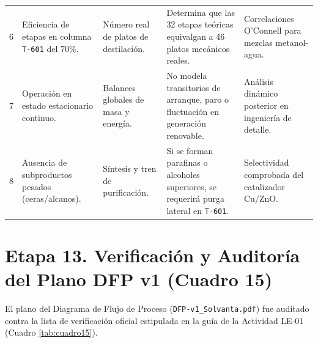 \documentclass[10pt,letterpaper]{article}
\begin{document}
\begin{table}[H]
\begin{tabularx}{\textwidth}{c >{\raggedright\arraybackslash}p{2.6cm} >{\raggedright\arraybackslash}p{2.2cm} >{\raggedright\arraybackslash}X >{\raggedright\arraybackslash}p{3.2cm}}
6 & Eficiencia de etapas en columna \texttt{T-601} del $70\%$. & Número real de platos de destilación. & Determina que las 32 etapas teóricas equivalgan a 46 platos mecánicos reales. & Correlaciones O'Connell para mezclas metanol-agua. \\
7 & Operación en estado estacionario continuo. & Balances globales de masa y energía. & No modela transitorios de arranque, paro o fluctuación en generación renovable. & Análisis dinámico posterior en ingeniería de detalle. \\
8 & Ausencia de subproductos pesados (ceras/alcanos). & Síntesis y tren de purificación. & Si se forman parafinas o alcoholes superiores, se requerirá purga lateral en \texttt{T-601}. & Selectividad comprobada del catalizador $\text{Cu/ZnO}$. \\
\bottomrule
\end{tabularx}
\end{table}

\newpage
\section{Etapa 13. Verificación y Auditoría del Plano DFP v1 (Cuadro 15)}

El plano del Diagrama de Flujo de Proceso (\texttt{DFP-v1\_Solvanta.pdf}) fue auditado contra la lista de verificación oficial estipulada en la guía de la Actividad LE-01 (Cuadro \ref{tab:cuadro15}).
\end{document}
